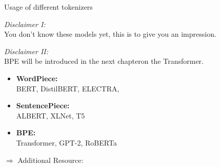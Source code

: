\begin{frame}{Usage of different tokenizers}

\vfill

\textit{Disclaimer I:}\\You don't know these models yet, this is to give you an impression.\\

\vspace{.3cm}

\textit{Disclaimer II:}\\BPE will be introduced in the next chapteron the Transformer.

\vspace{.3cm}

	\begin{itemize}
		\item \textbf{WordPiece:}\\
					BERT, DistilBERT, ELECTRA, 
		\item \textbf{SentencePiece:}\\
					ALBERT, XLNet, T5
		\item \textbf{BPE:}\\
					Transformer, GPT-2, RoBERTa
	\end{itemize}
	
	\vspace{.3cm}
	
	$\Rightarrow$ Additional Resource: \href{https://huggingface.co/docs/transformers/tokenizer_summary}{}

\vfill

\end{frame}


\endlecture

